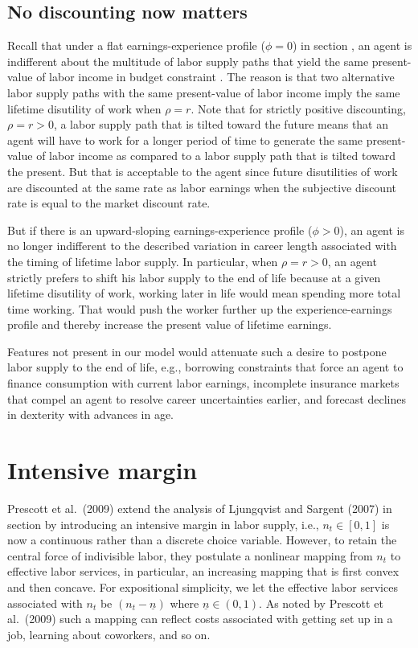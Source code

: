 \subsection{No discounting now matters}

Recall that under a flat earnings-experience profile ($\phi=0$)
in section , an agent is indifferent about
the multitude of labor supply paths that yield the same
present-value of labor income in budget constraint
. The reason is that two alternative labor supply
paths with the same present-value of labor income imply
the same lifetime disutility of work when
$\rho = r$. Note that for strictly positive discounting,
$\rho =r >0$, a labor supply path that is tilted toward
the future means that an agent will have to work for
a longer period of time to generate the same present-value
of labor income as compared to a labor supply path that
is tilted toward the present. But that is acceptable to
the agent since future disutilities of work are discounted
at the same rate as labor earnings when the subjective
discount rate is equal to the market discount rate.

But if there is an upward-sloping earnings-experience profile
($\phi >0$), an agent is no longer indifferent to the
described variation in career length associated with the timing
of lifetime labor supply. In particular, when $\rho = r>0$,
an agent strictly prefers to shift his labor supply to the end
of life because at a given lifetime disutility of work, working
later in life would mean spending more total time working.
That would push the worker further up the experience-earnings
profile and thereby increase the present value of lifetime
earnings.

Features  not present in our model would attenuate
 such a desire to postpone labor supply to the end
of life, e.g., borrowing constraints that force an
agent to finance consumption with current labor earnings,
incomplete insurance markets that compel an agent to resolve
career uncertainties earlier, and
forecast declines in dexterity with advances in age.


\section{Intensive margin}\label{sec:LSintensive}%
Prescott et al.\ (2009) extend the analysis of Ljungqvist and
Sargent (2007) in section  by introducing an
intensive margin in labor supply, i.e., $n_t\in [0,1]$ is now a
continuous rather than a discrete choice variable. However,
to retain the central force of indivisible labor, they postulate
a nonlinear mapping from $n_t$ to effective labor services, in particular, an
increasing mapping that is first convex and then concave. For
expositional simplicity, we let the effective labor services associated with
$n_t$ be $(n_t - \underline{n})$ where $\underline{n}\in(0,1)$.
As noted by Prescott et al.\ (2009) such a mapping can reflect
 costs associated with getting set up in a job, learning about coworkers, and so on.
%
%

